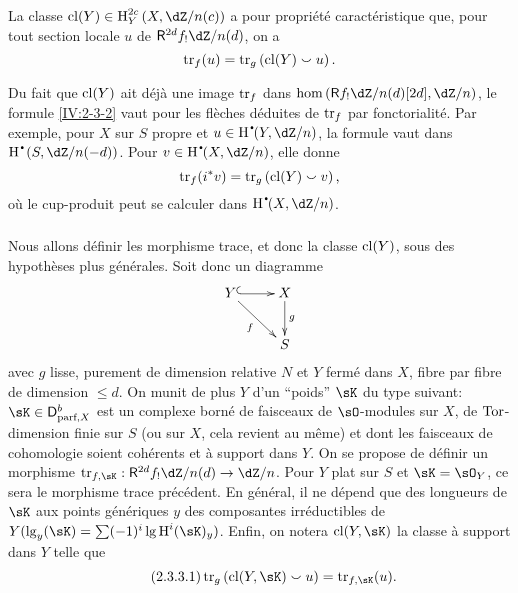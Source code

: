 \begin{definition}\label{IV:2-3-2}
La classe $\cl(Y)\in\h_Y^{2 c}\left(X,\dZ/n(c)\right)$ a pour propriété 
caractéristique que, pour tout section locale $u$ de $\R^{2 d}f_! \dZ/n(d)$, 
on a 
\[
  \operatorname{tr}_f(u) = \operatorname{tr}_g\left(\operatorname{cl}(Y)\smallsmile u\right) \text{.}
\]
\end{definition}

Du fait que $\operatorname{cl}(Y)$ ait déjà une image $\operatorname{tr}_f$ dans 
$\hom\left(\R f_!\dZ/n(d)[2 d],\dZ/n\right)$, le formule \ref{IV:2-3-2} vaut 
pour les flèches déduites de $\operatorname{tr}_f$ par fonctorialité. Par exemple, 
pour $X$ sur $S$ propre et $u\in \h^\bullet(Y,\dZ/n)$, la formule vaut dans 
$\h^\bullet\left(S,\dZ/n(-d)\right)$. Pour $v\in \h^\bullet(X,\dZ/n)$, elle 
donne 
\[
  \operatorname{tr}_f(i^* v) = \operatorname{tr}_g\left(\operatorname{cl}(Y)\smallsmile v\right) \text{,}
\]
où le cup-produit peut se calculer dans $\h^\bullet(X,\dZ/n)$. 





\subsubsection{}\label{IV:2-3-3}

Nous allons définir les morphisme trace, et donc la classe $\operatorname{cl}(Y)$, sous des 
hypothèses plus générales. Soit donc un diagramme 
\[\xymatrix{
  Y \ar@{^{(}->}[r] \ar[dr]_-f 
    & X \ar[d]^-g \\
  & S
}\]
avec $g$ lisse, purement de dimension relative $N$ et $Y$ fermé dans $X$, 
fibre par fibre de dimension $\leqslant d$. On munit de plus $Y$ d'un 
``poids'' $\sK$ du type suivant: $\sK\in\D_{\text{parf},X}^b$ est un 
complexe borné de faisceaux de $\sO$-modules sur $X$, de $\operatorname{Tor}$-dimension 
finie sur $S$ (ou sur $X$, cela revient au même) et dont les faisceaux de 
cohomologie soient cohérents et à support dans $Y$. On se propose de 
définir un morphisme $\tr_{f,\sK}:\R^{2 d}f_! \dZ/n(d) \to \dZ/n$. Pour $Y$ 
plat sur $S$ et $\sK=\sO_Y$, ce sera le morphisme trace précédent. En 
général, il ne dépend que des longueurs de $\sK$ aux points 
génériques $y$ des composantes irréductibles de 
$Y(\operatorname{lg}_y(\sK) = \sum (-1)^i \operatorname{lg} \h^i(\sK)_y)$. 
Enfin, on notera $\cl(Y,\sK)$ la classe à support dans $Y$ telle que 
\begin{equation*}\tag{2.3.3.1}\label{IV:eq:2-3-3-1}
  \tr_g\left(\cl(Y,\sK)\smallsmile u\right) = \tr_{f,\sK}(u) \text{.}
\end{equation*}





